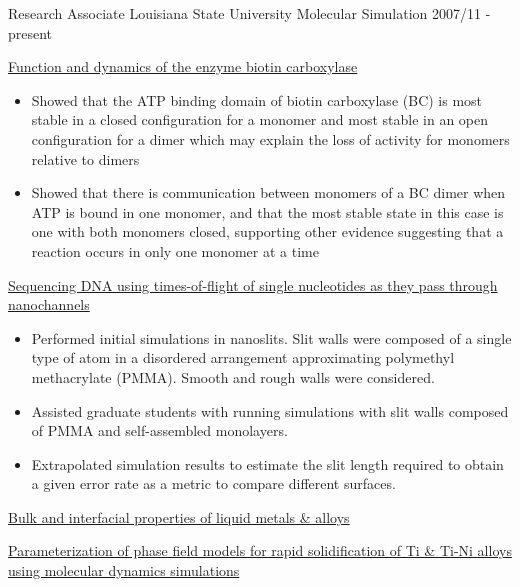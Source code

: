 \pagebreak


\begin{cventries}
  \cventry
    {Research Associate} %
    {Louisiana State University} %
    {Molecular Simulation} %
    {2007/11 - present} %
    {
      \begin{cvitems} %
        \item {\underline{Function and dynamics of the enzyme biotin carboxylase}}
            \begin{itemize}
            \item {Showed that the ATP binding domain of biotin carboxylase (BC) is most stable in a closed configuration for a monomer and most stable in an open configuration for a dimer which may explain the loss of activity for monomers relative to dimers}
            \item {Showed that there is communication between monomers of a BC dimer when ATP is bound in one monomer, and that the most stable state in this case is one with both monomers closed, supporting other evidence suggesting that a reaction occurs in only one monomer at a time}
            \end{itemize}
        \item {\underline{Sequencing DNA using times-of-flight of single nucleotides as they pass through nanochannels}}
            \begin{itemize}
            \item {Performed initial simulations in nanoslits. Slit walls were composed of a single type of atom in a disordered arrangement approximating polymethyl methacrylate (PMMA). Smooth and rough walls were considered.}
            \item {Assisted graduate students with running simulations with slit walls composed of PMMA and self-assembled monolayers.}
            \item {Extrapolated simulation results to estimate the slit length required to obtain a given error rate as a metric to compare different surfaces.}
            \end{itemize}        
        \item {\underline{Bulk and interfacial properties of liquid metals \& alloys}}
        \item {\underline{Parameterization of phase field models for rapid solidification of Ti \& Ti-Ni alloys using molecular dynamics simulations}}

\end{cvitems}}
\end{cventries}
